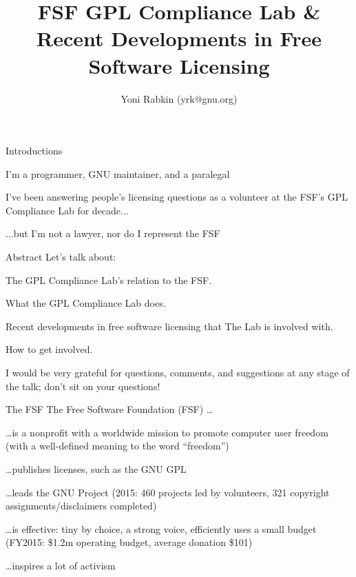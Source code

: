 \documentclass[
  size=12pt,
  style=simple,
  paper=screen
]{powerdot}
\title{FSF GPL Compliance Lab \& Recent Developments in Free Software Licensing}
\author{Yoni Rabkin (yrk@gnu.org)}
\begin{document}
\maketitle

\begin{wideslide}{Introductions}
  \begin{itemize}
    \setlength{\itemsep}{1em}

    \nitem I'm a programmer, GNU maintainer, and a paralegal
    \pp

    \nitem I've been answering people's licensing questions as a
    volunteer at the FSF's GPL Compliance Lab for decade...
    \pp

    \nitem ...but I'm not a lawyer, nor do I represent the FSF
  \end{itemize}
\end{wideslide}

\begin{wideslide}{Abstract}
  Let's talk about:
  \begin{itemize}
    \setlength{\itemsep}{1em}

    \nitem The GPL Compliance Lab's relation to the FSF.

    \nitem What the GPL Compliance Lab does.

    \nitem Recent developments in free software licensing that The Lab
    is involved with.

    \nitem How to get involved.

  \end{itemize}
  \pp

  I would be very grateful for questions, comments, and suggestions at
  any stage of the talk; don't sit on your questions!
\end{wideslide}

\begin{wideslide}{The FSF}
  The Free Software Foundation (FSF) \ldots
  \begin{itemize}
    \setlength{\itemsep}{1em}

    \nitem \ldots is a nonprofit with a worldwide mission to promote
    computer user freedom\pp\\(with a well-defined meaning to the
    word ``freedom'')

    \pp

    \nitem \ldots publishes licenses, such as the GNU GPL

    \pp

    \nitem \ldots leads the GNU Project \pp (2015: 460 projects led by
    volunteers, 321 copyright assignments/disclaimers completed)

    \pp

    \nitem \ldots is effective: tiny by choice, a strong voice,
    efficiently uses a small budget \pp (FY2015: \$1.2m operating
    budget, average donation \$101)

    \pp

    \nitem \ldots inspires a lot of activism
  \end{itemize}
\end{wideslide}
\end{document}
